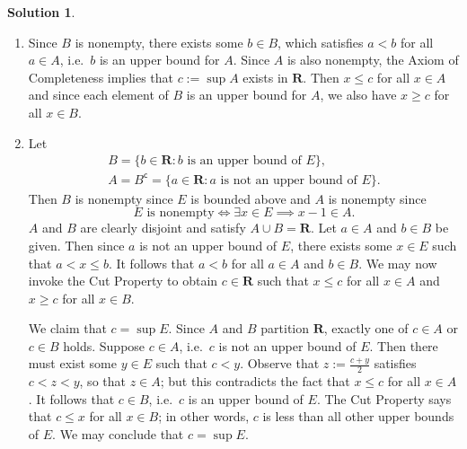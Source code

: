 \documentclass[12pt]{article}
\theoremstyle{definition}
\theoremstyle{exercise}
\theoremstyle{solution}
\newtheorem*{solution}{Solution}
\newcommand{\setcomp}[1]{#1^{\mathsf{c}}}
\newcommand{\R}{\mathbf{R}}
\begin{document}
\begin{solution}
    \begin{enumerate}
        \item Since \( B \) is nonempty, there exists some \( b \in B \), which satisfies \( a < b \) for all \( a \in A \), i.e.\ \( b \) is an upper bound for \( A \). Since \( A \) is also nonempty, the Axiom of Completeness implies that \( c := \sup A \) exists in \( \R \). Then \( x \leq c \) for all \( x \in A \) and since each element of \( B \) is an upper bound for \( A \), we also have \( x \geq c \) for all \( x \in B \).

        \item Let
        \[
            \begin{gathered}
            B = \{ b \in \mathbf{R} : b \text{ is an upper bound of } E \}, \\
            A = \setcomp{B} = \{ a \in \mathbf{R} : a \text{ is not an upper bound of } E \}.
            \end{gathered}
        \]
        Then \( B \) is nonempty since \( E \) is bounded above and \( A \) is nonempty since
        \[
            E \text{ is nonempty} \iff \exists x \in E \implies x - 1 \in A.
        \]
        \( A \) and \( B \) are clearly disjoint and satisfy \( A \cup B = \R \). Let \( a \in A \) and \( b \in B \) be given. Then since \( a \) is not an upper bound of \( E \), there exists some \( x \in E \) such that \( a < x \leq b \). It follows that \( a < b \) for all \( a \in A \) and \( b \in B \). We may now invoke the Cut Property to obtain \( c \in \R \) such that \( x \leq c \) for all \( x \in A \) and \( x \geq c \) for all \( x \in B \).

        We claim that \( c = \sup E \). Since \( A \) and \( B \) partition \( \R \), exactly one of \( c \in A \) or \( c \in B \) holds. Suppose \( c \in A \),  i.e.\ \( c \) is not an upper bound of \( E \). Then there must exist some \( y \in E \) such that \( c < y \). Observe that \( z := \tfrac{c + y}{2} \) satisfies \( c < z < y \), so that \( z \in A \); but this contradicts the fact that \( x \leq c \) for all \( x \in A \). It follows that \( c \in B \), i.e.\ \( c \) is an upper bound of \( E \). The Cut Property says that \( c \leq x \) for all \( x \in B \); in other words, \( c \) is less than all other upper bounds of \( E \). We may conclude that \( c = \sup E \).


\end{enumerate}
\end{solution}
\end{document}
